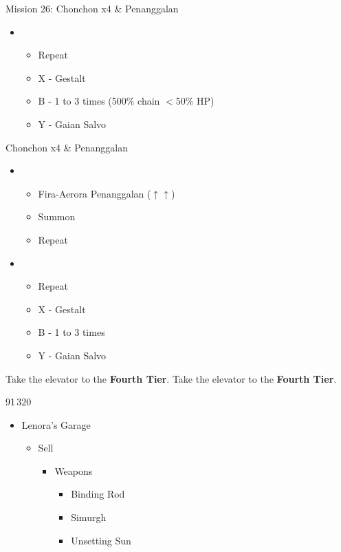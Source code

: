 \begin{paracol}{2}
\begin{battle}{Mission 26: Chonchon x4 \& Penanggalan}
\begin{itemize}
			\item \third
			      \begin{itemize}
				      \item Repeat
				      \item X - Gestalt
				      \item B - 1 to 3 times (500\% chain $<$50\% HP)
				      \item Y - Gaian Salvo
			      \end{itemize}
		\end{itemize}
	\end{battle}
	\switchcolumn
	\begin{battle}{Chonchon x4 \& Penanggalan}
		\begin{itemize}
			\item \second
			      \begin{itemize}
				      \item Fira-Aerora Penanggalan ($\uparrow\uparrow$)
				      \item Summon
				      \item Repeat
			      \end{itemize}
			\item \third
			      \begin{itemize}
				      \item Repeat
				      \item X - Gestalt
				      \item B - 1 to 3 times
				      \item Y - Gaian Salvo
			      \end{itemize}
		\end{itemize}
	\end{battle}
	\switchcolumn*
	Take the elevator to the \textbf{Fourth Tier}.
	\switchcolumn
	Take the elevator to the \textbf{Fourth Tier}.
	\switchcolumn*
	\switchcolumn
	\begin{shop}{91\,320}
		\begin{itemize}
			\item Lenora's Garage
			      \begin{itemize}
				      \item Sell
				            \begin{itemize}
					            \item Weapons
					                  \begin{itemize}
						                  \item Binding Rod
						                  \item Simurgh
						                  \item Unsetting Sun

\end{itemize}
\end{itemize}
\end{itemize}
\end{itemize}
\end{shop}
\end{paracol}
